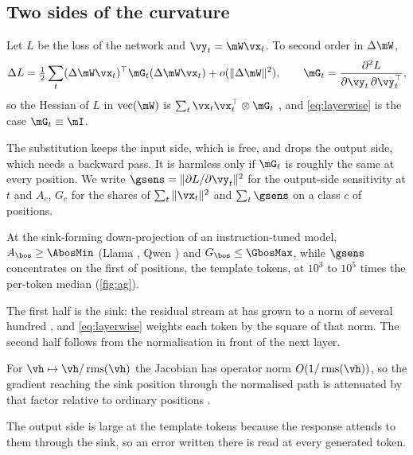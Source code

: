 \subsection{Two sides of the curvature}
\label{sec:mechanism:sides}
\begin{lemma}
\label{lem:twosides}
Let $L$ be the loss of the network and $\vy_t=\mW\vx_t$.
To second order in $\Delta\mW$,
\begin{equation}
\label{eq:twosides}
\Delta L=\tfrac12\sum_{t}(\Delta\mW\vx_t)^\top\mG_t(\Delta\mW\vx_t)+o(\|\Delta\mW\|^2),\qquad \mG_t=\frac{\partial^2L}{\partial\vy_t\,\partial\vy_t^\top},
\end{equation}
so the Hessian of $L$ in $\operatorname{vec}(\mW)$ is $\sum_t\vx_t\vx_t^\top\otimes\mG_t$ \citep{martens2015kfac}, and \cref{eq:layerwise} is the case $\mG_t\equiv\mI$.
\end{lemma}
The substitution keeps the input side, which is free, and drops the output side, which needs a backward pass.
It is harmless only if $\mG_t$ is roughly the same at every position.
We write $\gsens=\|\partial L/\partial\vy_t\|^2$ for the output-side sensitivity at $t$ and $A_c$, $G_c$ for the shares of $\sum_t\|\vx_t\|^2$ and $\sum_t\gsens$ on a class $c$ of positions.
\begin{proposition}
\label{prop:mismatch}
At the sink-forming down-projection of an instruction-tuned model, $A_{\bos}\ge\AbosMin$ (Llama \LAbos{}, Qwen \QAbos{}) and $G_{\bos}\le\GbosMax$, while $\gsens$ concentrates on the first \Gshare{} of positions, the template tokens, at $10^3$ to $10^5$ times the per-token median (\cref{fig:ag}).
\end{proposition}
The first half is the sink: the residual stream at \bos{} has grown to a norm of several hundred \citep{sun2024massive}, and \cref{eq:layerwise} weights each token by the square of that norm.
The second half follows from the normalisation in front of the next layer.
\begin{lemma}
\label{lem:rmsnorm}
For $\vh\mapsto\vh/\operatorname{rms}(\vh)$ the Jacobian has operator norm $O(1/\operatorname{rms}(\vh))$, so the gradient reaching the sink position through the normalised path is attenuated by that factor relative to ordinary positions \citep{chen2026gradientsinks}.
\end{lemma}
The output side is large at the template tokens because the response attends to them through the sink, so an error written there is read at every generated token.
